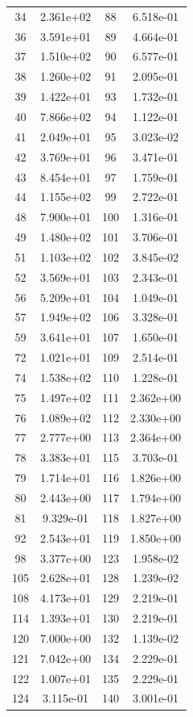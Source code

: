 \documentclass[12pt]{article}
\begin{document}
\begin{longtable}{@{}cccc@{}}
34 & 2.361e+02 & 88 & 6.518e-01 \\
36 & 3.591e+01 & 89 & 4.664e-01 \\
37 & 1.510e+02 & 90 & 6.577e-01 \\
38 & 1.260e+02 & 91 & 2.095e-01 \\
39 & 1.422e+01 & 93 & 1.732e-01 \\
40 & 7.866e+02 & 94 & 1.122e-01 \\
41 & 2.049e+01 & 95 & 3.023e-02 \\
42 & 3.769e+01 & 96 & 3.471e-01 \\
43 & 8.454e+01 & 97 & 1.759e-01 \\
44 & 1.155e+02 & 99 & 2.722e-01 \\
48 & 7.900e+01 & 100 & 1.316e-01 \\
49 & 1.480e+02 & 101 & 3.706e-01 \\
51 & 1.103e+02 & 102 & 3.845e-02 \\
52 & 3.569e+01 & 103 & 2.343e-01 \\
56 & 5.209e+01 & 104 & 1.049e-01 \\
57 & 1.949e+02 & 106 & 3.328e-01 \\
59 & 3.641e+01 & 107 & 1.650e-01 \\
72 & 1.021e+01 & 109 & 2.514e-01 \\
74 & 1.538e+02 & 110 & 1.228e-01 \\
75 & 1.497e+02 & 111 & 2.362e+00 \\
76 & 1.089e+02 & 112 & 2.330e+00 \\
77 & 2.777e+00 & 113 & 2.364e+00 \\
78 & 3.383e+01 & 115 & 3.703e-01 \\
79 & 1.714e+01 & 116 & 1.826e+00 \\
80 & 2.443e+00 & 117 & 1.794e+00 \\
81 & 9.329e-01 & 118 & 1.827e+00 \\
92 & 2.543e+01 & 119 & 1.850e+00 \\
98 & 3.377e+00 & 123 & 1.958e-02 \\
105 & 2.628e+01 & 128 & 1.239e-02 \\
108 & 4.173e+01 & 129 & 2.219e-01 \\
114 & 1.393e+01 & 130 & 2.219e-01 \\
120 & 7.000e+00 & 132 & 1.139e-02 \\
121 & 7.042e+00 & 134 & 2.229e-01 \\
122 & 1.007e+01 & 135 & 2.229e-01 \\
124 & 3.115e-01 & 140 & 3.001e-01 \\

\end{longtable}
\end{document}
